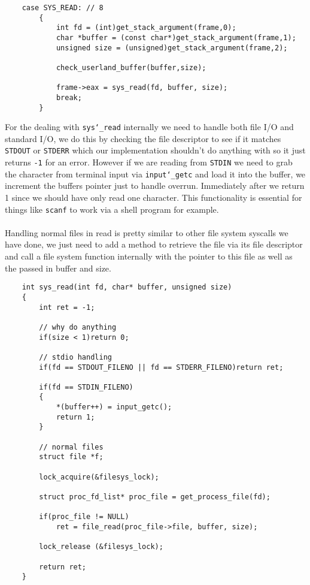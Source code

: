 \documentclass[]{article}
\begin{document}
  
  			\lstset{language=C, tabsize=2}  
		    \begin{lstlisting}   
	case SYS_READ: // 8
		{
			int fd = (int)get_stack_argument(frame,0);
			char *buffer = (const char*)get_stack_argument(frame,1);
			unsigned size = (unsigned)get_stack_argument(frame,2);
			
			check_userland_buffer(buffer,size);
			
			frame->eax = sys_read(fd, buffer, size);
			break;
		}
		   \end{lstlisting}	
  \newpage
    			For the dealing with \texttt{sys\char`_read} internally we need to handle both file I/O and standard I/O, we do this by checking the file descriptor to see if it matches \texttt{STDOUT} or \texttt{STDERR} which our implementation shouldn't do anything with so it just returns \texttt{-1} for an error. However if we are reading from \texttt{STDIN} we need to grab the character from terminal input via \texttt{input\char`_getc} and load it into the buffer, we increment the buffers pointer just to handle overrun. Immediately after we return 1 since we should have only read one character. This functionality is essential for things like \texttt{scanf} to work via a shell program for example.\texttt{}\\\\
    			Handling normal files in read is pretty similar to other file system syscalls we have done, we just need to add a method to retrieve the file via its file descriptor and call a file system function internally with the pointer to this file as well as the passed in buffer and size.\\
			\lstset{language=C, tabsize=2}  
		    \begin{lstlisting}   
	int sys_read(int fd, char* buffer, unsigned size)
	{
		int ret = -1;
		
		// why do anything		
		if(size < 1)return 0;

		// stdio handling
		if(fd == STDOUT_FILENO || fd == STDERR_FILENO)return ret;
		
		if(fd == STDIN_FILENO)
		{
			*(buffer++) = input_getc();
			return 1;
		}

		// normal files		
		struct file *f;

		lock_acquire(&filesys_lock);
	
	  	struct proc_fd_list* proc_file = get_process_file(fd);

	  	if(proc_file != NULL)
	  		ret = file_read(proc_file->file, buffer, size);
	
		lock_release (&filesys_lock);
		
		return ret;
	}

		   \end{lstlisting}	  
		   
\end{document}
